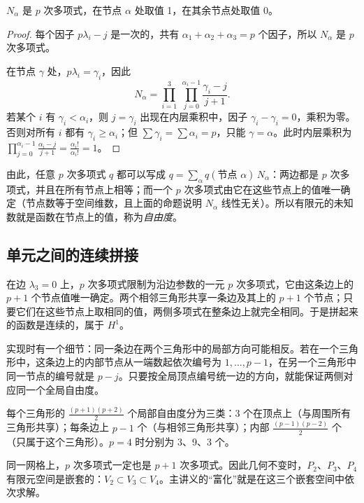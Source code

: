 \documentclass[11pt,a4paper,fontset=fandol]{ctexart}
\begin{document}
\begin{proposition}
$N_\alpha$ 是 $p$ 次多项式，在节点 $\alpha$ 处取值 1，在其余节点处取值 0。
\end{proposition}

\begin{proof}
每个因子 $p\lambda_i-j$ 是一次的，共有 $\alpha_1+\alpha_2+\alpha_3=p$ 个因子，所以 $N_\alpha$ 是 $p$ 次多项式。

在节点 $\gamma$ 处，$p\lambda_i=\gamma_i$，因此
\[
N_\alpha=\prod_{i=1}^3\ \prod_{j=0}^{\alpha_i-1}\frac{\gamma_i-j}{j+1}.
\]
若某个 $i$ 有 $\gamma_i<\alpha_i$，则 $j=\gamma_i$ 出现在内层乘积中，因子 $\gamma_i-\gamma_i=0$，乘积为零。否则对所有 $i$ 都有 $\gamma_i\ge\alpha_i$；但 $\sum\gamma_i=\sum\alpha_i=p$，只能 $\gamma=\alpha$。此时内层乘积为 $\prod_{j=0}^{\alpha_i-1}\frac{\alpha_i-j}{j+1}=\frac{\alpha_i!}{\alpha_i!}=1$。
\end{proof}

由此，任意 $p$ 次多项式 $q$ 都可以写成 $q=\sum_\alpha q(\text{节点 }\alpha)\,N_\alpha$：两边都是 $p$ 次多项式，并且在所有节点上相等；而一个 $p$ 次多项式由它在这些节点上的值唯一确定（节点数等于空间维数，且上面的命题说明 $N_\alpha$ 线性无关）。所以有限元的未知数就是函数在节点上的值，称为\emph{自由度}。

\subsection{单元之间的连续拼接}
\label{sec:continuity}

在边 $\lambda_3=0$ 上，$p$ 次多项式限制为沿边参数的一元 $p$ 次多项式，它由这条边上的 $p+1$ 个节点值唯一确定。两个相邻三角形共享一条边及其上的 $p+1$ 个节点；只要它们在这些节点上取相同的值，两侧多项式在整条边上就完全相同。于是拼起来的函数是连续的，属于 $H^1$。

实现时有一个细节：同一条边在两个三角形中的局部方向可能相反。若在一个三角形中，这条边上的内部节点从一端数起依次编号为 $1,\dots,p-1$，在另一个三角形中同一节点的编号就是 $p-j$。只要按全局顶点编号统一边的方向，就能保证两侧对应同一个全局自由度。

每个三角形的 $\frac{(p+1)(p+2)}2$ 个局部自由度分为三类：3 个在顶点上（与周围所有三角形共享）；每条边上 $p-1$ 个（与相邻三角形共享）；内部 $\frac{(p-1)(p-2)}2$ 个（只属于这个三角形）。$p=4$ 时分别为 3、9、3 个。

\begin{keypoint}
同一网格上，$p$ 次多项式一定也是 $p+1$ 次多项式。因此几何不变时，$P_2$、$P_3$、$P_4$ 有限元空间是嵌套的：$V_2\subset V_3\subset V_4$。主讲义的“富化”就是在这三个嵌套空间中依次求解。
\end{keypoint}
\end{document}

